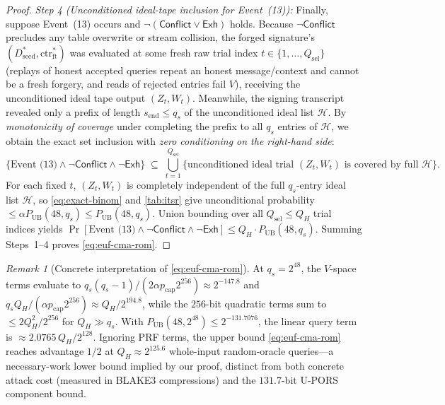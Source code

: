 \documentclass[11pt,a4paper]{article}
\theoremstyle{definition}
\theoremstyle{remark}
\newtheorem{remark}[theorem]{Remark}
\newcommand{\UPORS}{\textsf{U-PORS}}
\newcommand{\BLAKE}{\textsf{BLAKE3}}
\begin{document}
\begin{proof}
\emph{Step 4 (Unconditioned ideal-tape inclusion for Event~(13)):}
Finally, suppose Event~(13) occurs and $\neg (\mathsf{Conflict} \vee \mathsf{Exh})$ holds. Because $\neg \mathsf{Conflict}$ precludes any table overwrite or stream collision, the forged signature's $(D_{\mathrm{seed}}^*, \mathrm{ctr}_{\mathrm{ft}}^*)$ was evaluated at some fresh raw trial index $t \in \{1, \dots, Q_{\mathrm{sel}}\}$ (replays of honest accepted queries repeat an honest message/context and cannot be a fresh forgery, and reads of rejected entries fail $V$), receiving the unconditioned ideal tape output $(Z_t, W_t)$. Meanwhile, the signing transcript revealed only a prefix of length $s_{\mathrm{end}} \le q_s$ of the unconditioned ideal list $\mathcal{H}$. By \emph{monotonicity of coverage} under completing the prefix to all $q_s$ entries of $\mathcal{H}$, we obtain the exact set inclusion with \emph{zero conditioning on the right-hand side}:
\[
  \{\text{Event~(13)} \wedge \neg \mathsf{Conflict} \wedge \neg \mathsf{Exh}\}
  \;\subseteq\;
  \bigcup_{t=1}^{Q_{\mathrm{sel}}}
    \big\{\text{unconditioned ideal trial } (Z_t, W_t) \text{ is covered by full } \mathcal{H}\big\}.
\]
For each fixed $t$, $(Z_t, W_t)$ is completely independent of the full $q_s$-entry ideal list $\mathcal{H}$, so \eqref{eq:exact-binom} and \cref{tab:itsr} give unconditional probability $\le \alpha P_{\mathrm{UB}}(48, q_s) \le P_{\mathrm{UB}}(48, q_s)$. Union bounding over all $Q_{\mathrm{sel}} \le Q_H$ trial indices yields $\Pr[\text{Event~(13)} \wedge \neg \mathsf{Conflict} \wedge \neg \mathsf{Exh}] \le Q_H \cdot P_{\mathrm{UB}}(48, q_s)$. Summing Steps~1--4 proves \eqref{eq:euf-cma-rom}.
\end{proof}

\begin{remark}[Concrete interpretation of \eqref{eq:euf-cma-rom}]
At $q_s = 2^{48}$, the $V$-space terms evaluate to $q_s(q_s - 1)/(2\alpha p_{\mathrm{cap}} 2^{256}) \approx 2^{-147.8}$ and $q_s Q_H / (\alpha p_{\mathrm{cap}} 2^{256}) \approx Q_H / 2^{194.8}$, while the $256$-bit quadratic terms sum to $\le 2 Q_H^2 / 2^{256}$ for $Q_H \gg q_s$. With $P_{\mathrm{UB}}(48, 2^{48}) \le 2^{-131.7076}$, the linear query term is $\approx 2.0765\, Q_H / 2^{128}$. Ignoring PRF terms, the upper bound \eqref{eq:euf-cma-rom} reaches advantage $1/2$ at $Q_H \approx 2^{125.6}$ whole-input random-oracle queries---a necessary-work lower bound implied by our proof, distinct from both concrete attack cost (measured in \BLAKE{} compressions) and the $131.7$-bit \UPORS{} component bound.
\end{remark}
\end{document}
